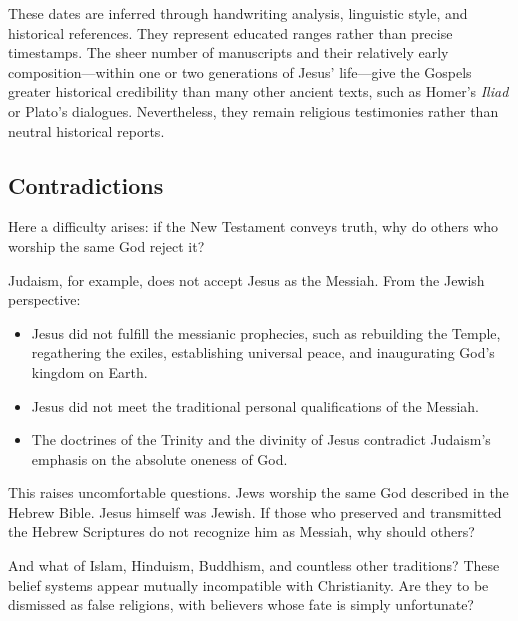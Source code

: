 These dates are inferred through handwriting analysis, linguistic style, and historical references. They represent educated ranges rather than precise timestamps. The sheer number of manuscripts and their relatively early composition—within one or two generations of Jesus’ life—give the Gospels greater historical credibility than many other ancient texts, such as Homer’s \emph{Iliad} or Plato’s dialogues. Nevertheless, they remain religious testimonies rather than neutral historical reports.

\subsection*{Contradictions}

Here a difficulty arises: if the New Testament conveys truth, why do others who worship the same God reject it?

Judaism, for example, does not accept Jesus as the Messiah. From the Jewish perspective:
\begin{itemize}
  \item Jesus did not fulfill the messianic prophecies, such as rebuilding the Temple, regathering the exiles, establishing universal peace, and inaugurating God’s kingdom on Earth.
  \item Jesus did not meet the traditional personal qualifications of the Messiah.
  \item The doctrines of the Trinity and the divinity of Jesus contradict Judaism’s emphasis on the absolute oneness of God.
\end{itemize}

This raises uncomfortable questions. Jews worship the same God described in the Hebrew Bible. Jesus himself was Jewish. If those who preserved and transmitted the Hebrew Scriptures do not recognize him as Messiah, why should others?

And what of Islam, Hinduism, Buddhism, and countless other traditions? These belief systems appear mutually incompatible with Christianity. Are they to be dismissed as false religions, with believers whose fate is simply unfortunate?


